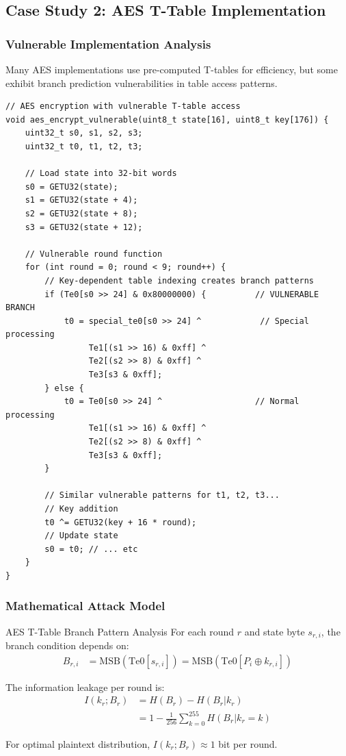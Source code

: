 \documentclass[11pt,a4paper]{article}
\theoremstyle{definition}
\begin{document}
\subsection{Case Study 2: AES T-Table Implementation}

\subsubsection{Vulnerable Implementation Analysis}

Many AES implementations use pre-computed T-tables for efficiency, but some exhibit branch prediction vulnerabilities in table access patterns.

\begin{lstlisting}[caption={Vulnerable AES T-Table Implementation}]
// AES encryption with vulnerable T-table access
void aes_encrypt_vulnerable(uint8_t state[16], uint8_t key[176]) {
    uint32_t s0, s1, s2, s3;
    uint32_t t0, t1, t2, t3;
    
    // Load state into 32-bit words
    s0 = GETU32(state);
    s1 = GETU32(state + 4);
    s2 = GETU32(state + 8);
    s3 = GETU32(state + 12);
    
    // Vulnerable round function
    for (int round = 0; round < 9; round++) {
        // Key-dependent table indexing creates branch patterns
        if (Te0[s0 >> 24] & 0x80000000) {          // VULNERABLE BRANCH
            t0 = special_te0[s0 >> 24] ^            // Special processing
                 Te1[(s1 >> 16) & 0xff] ^
                 Te2[(s2 >> 8) & 0xff] ^
                 Te3[s3 & 0xff];
        } else {
            t0 = Te0[s0 >> 24] ^                   // Normal processing
                 Te1[(s1 >> 16) & 0xff] ^
                 Te2[(s2 >> 8) & 0xff] ^
                 Te3[s3 & 0xff];
        }
        
        // Similar vulnerable patterns for t1, t2, t3...
        // Key addition
        t0 ^= GETU32(key + 16 * round);
        // Update state
        s0 = t0; // ... etc
    }
}
\end{lstlisting}

\subsubsection{Mathematical Attack Model}

\begin{mathematicsbox}{AES T-Table Branch Pattern Analysis}
For each round $r$ and state byte $s_{r,i}$, the branch condition depends on:
\begin{align}
B_{r,i} &= \text{MSB}(\text{Te0}[s_{r,i}]) = \text{MSB}(\text{Te0}[P_i \oplus k_{r,i}])
\end{align}

The information leakage per round is:
\begin{align}
I(k_r; B_r) &= H(B_r) - H(B_r|k_r) \\
&= 1 - \frac{1}{256} \sum_{k=0}^{255} H(B_r|k_r = k)
\end{align}

For optimal plaintext distribution, $I(k_r; B_r) \approx 1$ bit per round.
\end{mathematicsbox}
\end{document}
